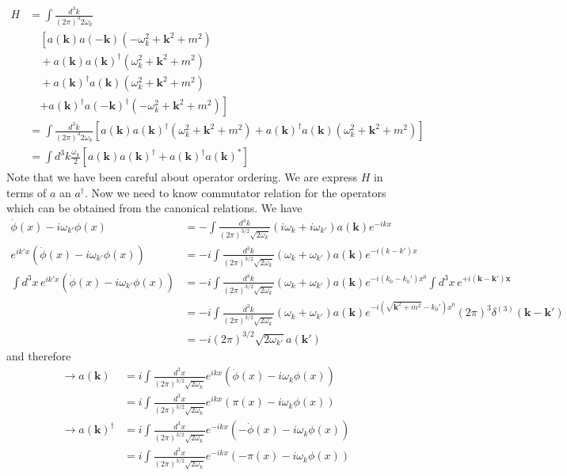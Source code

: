 \documentclass{article}
\begin{document}
\begin{align}
H
&=\int\frac{d^3k}{(2\pi)^{3}2\omega_k}\\
&\quad\left[a(\mathbf{k})a(-\mathbf{k})(-\omega_k^2+\mathbf{k}^2+m^2)\right.\\
&\quad +a(\mathbf{k})a(\mathbf{k})^\dagger(\omega_k^2+\mathbf{k}^2+m^2)\\
&\quad +a(\mathbf{k})^\dagger a(\mathbf{k})(\omega_k^2+\mathbf{k}^2+m^2)\\
&\quad\left.+a(\mathbf{k})^\dagger a(-\mathbf{k})^\dagger(-\omega_k^2+\mathbf{k}^2+m^2)\right]\\
&=\int\frac{d^3k}{(2\pi)^{3}2\omega_k}
[a(\mathbf{k})a(\mathbf{k})^\dagger(\omega_k^2+\mathbf{k}^2+m^2)
 +a(\mathbf{k})^\dagger a(\mathbf{k})(\omega_k^2+\mathbf{k}^2+m^2)]\\
&=\int d^3k\frac{\omega_k}{2}[a(\mathbf{k})a(\mathbf{k})^\dagger+a(\mathbf{k})^\dagger a(\mathbf{k})^*]
\end{align}
Note that we have been careful about operator ordering. We are express $H$ in terms of $a$ an $a^\dagger$. Now we need to know commutator relation for the operators which can be obtained from the canonical relations. We have
\begin{align}
\dot{\phi}(x)-i\omega_{k'}\phi(x)
&=-\int\frac{d^3k}{(2\pi)^{3/2}\sqrt{2\omega_k}}(i\omega_k+i\omega_{k'})a(\mathbf{k})e^{-ikx}\\
e^{ik'x}(\dot{\phi}(x)-i\omega_{k'}\phi(x))
&=-i\int\frac{d^3k}{(2\pi)^{3/2}\sqrt{2\omega_k}}(\omega_k+\omega_{k'})a(\mathbf{k})e^{-i(k-k')x}\\
\int d^3x\,e^{ik'x}(\dot{\phi}(x)-i\omega_{k'}\phi(x))
&=-i\int\frac{d^3k}{(2\pi)^{3/2}\sqrt{2\omega_k}}(\omega_k+\omega_{k'})a(\mathbf{k})e^{-i(k_0-k_0')x^0}\int d^3x\,e^{+i(\mathbf{k}-\mathbf{k}')\mathbf{x}}\\
&=-i\int\frac{d^3k}{(2\pi)^{3/2}\sqrt{2\omega_k}}(\omega_k+\omega_{k'})a(\mathbf{k})e^{-i(\sqrt{\mathbf{k}^2+m^2}-k_0')x^0}(2\pi)^3\delta^{(3)}(\mathbf{k}-\mathbf{k}')\\
&=-i(2\pi)^{3/2}\sqrt{2\omega_{k'}}a(\mathbf{k}')
\end{align}
and therefore
\begin{align}
\rightarrow a(\mathbf{k})
&=i\int\frac{d^3x}{(2\pi)^{3/2}\sqrt{2\omega_k}}e^{ikx}(\dot{\phi}(x)-i\omega_k\phi(x))\\
&=i\int\frac{d^3x}{(2\pi)^{3/2}\sqrt{2\omega_k}}e^{ikx}(\pi(x)-i\omega_k\phi(x))    \label{eqn:asForFreeTheory}  \\
\rightarrow a(\mathbf{k})^\dagger
&=i\int\frac{d^3x}{(2\pi)^{3/2}\sqrt{2\omega_k}}e^{-ikx}(-\dot{\phi}(x)-i\omega_k\phi(x))\\
&=i\int\frac{d^3x}{(2\pi)^{3/2}\sqrt{2\omega_k}}e^{-ikx}(-\pi(x)-i\omega_k\phi(x))
\end{align}
\end{document}
